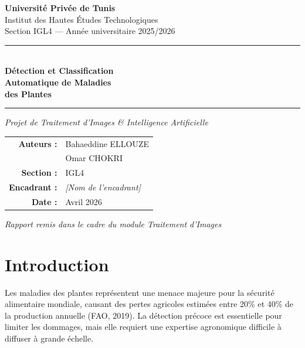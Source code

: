 \documentclass[12pt,a4paper]{article}
\begin{document}
\begin{titlepage}
\centering
\vspace*{1cm}
{\large\textbf{Université Privée de Tunis}\\
Institut des Hautes Études Technologiques\\[0.3cm]
Section IGL4 — Année universitaire 2025/2026}

\vspace{2cm}
\rule{\linewidth}{2pt}\\[0.4cm]
{\Huge\bfseries\color{darkbg}
Détection et Classification\\[0.2cm]
Automatique de Maladies\\[0.2cm]
des Plantes}\\[0.4cm]
\rule{\linewidth}{2pt}

\vspace{1.5cm}
{\large\textit{Projet de Traitement d'Images \& Intelligence Artificielle}}

\vspace{2cm}
\begin{tabular}{rl}
\textbf{Auteurs :} & Bahaeddine ELLOUZE \\
                   & Omar CHOKRI \\[0.3cm]
\textbf{Section :} & IGL4 \\[0.3cm]
\textbf{Encadrant :} & \textit{[Nom de l'encadrant]} \\[0.3cm]
\textbf{Date :} & Avril 2026 \\
\end{tabular}

\vfill
{\small\textit{Rapport remis dans le cadre du module Traitement d'Images}}
\end{titlepage}

\tableofcontents
\newpage

\section{Introduction}

Les maladies des plantes représentent une menace majeure pour la sécurité alimentaire mondiale, 
causant des pertes agricoles estimées entre 20\% et 40\% de la production annuelle 
(FAO, 2019). La détection précoce est essentielle pour limiter les dommages, 
mais elle requiert une expertise agronomique difficile à diffuser à grande échelle.
\end{document}
